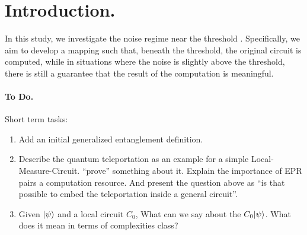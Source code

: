 \section{Introduction.}
In this study, we investigate the noise regime near the threshold \cite{aharonov1999faulttolerant}. Specifically, we aim to develop a mapping such that, beneath the threshold, the original circuit is computed, while in situations where the noise is slightly above the threshold, there is still a guarantee that the result of the computation is meaningful. 

 \paragraph{To Do.} Short term tasks:
 \begin{enumerate}
   \item Add an initial generalized entanglement definition.
   \item Describe the quantum teleportation as an example for a simple Local-Measure-Circuit. ``prove'' something about it. Explain the importance of EPR pairs a computation resource. And present the question above as ``is that possible to embed the teleportation inside a general circuit''.  
   \item Given ${\ket{\psi}}$ and a local circuit $C_{0}$, What can we say about the $C_{0}{\ket{\psi}}$. What does it mean in terms of complexities class?   
 \end{enumerate}




